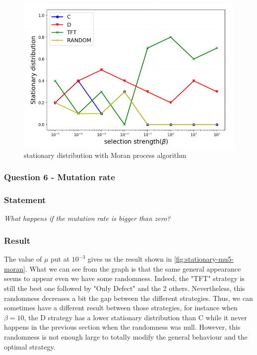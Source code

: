 \documentclass{article}
\begin{document}
\begin{figure}[h]
  \centering
  \includegraphics[scale=0.35]{figures/stationary-moran.png}
  \caption{stationary distribution with Moran process algorithm}
  \label{fig:stationary-moran}
\end{figure}

\newpage
\subsubsection{Question 6 - Mutation rate}
\subsubsection*{Statement}
\textit{What happens if	the	mutation rate is bigger	than zero?}


\subsubsection{Result}
The value of $\mu$ put at $10^{-3}$ gives us the result shown in \autoref{fig:stationary-mu5-moran}. What we can see from the graph is that the same general appearance seems to appear even we have some randomness. Indeed, the "TFT" strategy is still the best one followed by "Only Defect" and the 2 others. Nevertheless, this randomness decreases a bit the gap between the different strategies. Thus, we can sometimes have a different result between those strategies, for instance when $\beta = 10$, the D strategy has a lower stationary distribution than C while it never happens in the previous section when the randomness was null. However, this randomness is not enough large to totally modify the general behaviour and the optimal strategy. 
\end{document}

